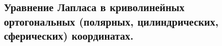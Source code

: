 \subsection{Уравнение Лапласа в криволинейных ортогональных (полярных, цилиндрических, сферических) координатах.}
\label{sec:14}
